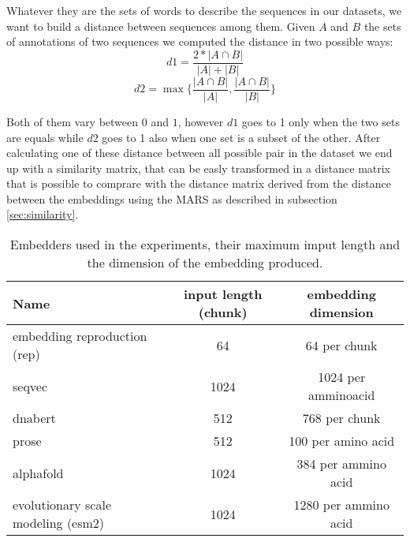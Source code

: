 \documentclass[12pt, letterpaper, twocolumn]{article}
\begin{document}
Whatever they are the sets of words to describe the sequences in our datasets, we want to build a distance between sequences among them. Given $A$ and $B$ the sets of annotations of two sequences we computed the distance in two possible ways: $$d1 = \frac{2 * |A \cap B|}{|A| + |B|} $$ $$d2 = \max\{ \frac{|A \cap B|}{|A|}, \frac{|A \cap B|}{|B|} \} $$

Both of them vary between $0$ and $1$, however $d1$ goes to 1 only when the two sets are equals while $d2$ goes to 1 also when one set is a subset of the other. After calculating one of these distance between all possible pair in the dataset we end up with a similarity matrix, that can be easly transformed in a distance matrix that is possible to comprare with the distance matrix derived from the distance between the embeddings using the MARS as described in subsection \ref{sec:similarity}.



\begin{table*}[htb]
\centering
\begin{tabular}{|l c c|} 
    \hline
    Name & input length (chunk) & embedding dimension  \\ 
    \hline
    embedding reproduction (rep)\cite{yang2018learned}       & 64    & 64 per chunk   \\
    seqvec \cite{heinzinger2019modeling} & 1024 & 1024 per amminoacid \\
    dnabert \cite{ji2021dnabert}                     & 512     & 768 per chunk \\
    prose   \cite{bepler2021learning}                   & 512   & 100 per amino acid   \\
    alphafold  \cite{jumper2021highly}                 & 1024   & 384 per ammino acid\\
    evolutionary scale modeling (esm2) \cite{lin2023evolutionary}   & 1024    & 1280 per ammino acid \\  
    \hline
\end{tabular}
\caption{Embedders used in the experiments, their maximum imput length and the dimension of the embedding produced.}
\label{tab:embedders}
\end{table*}
\end{document}
